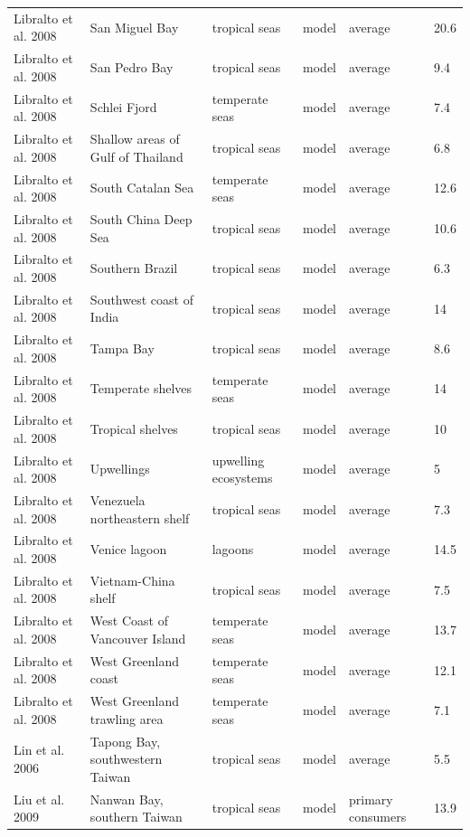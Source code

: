 \documentclass[oneside,12pt,final]{sty/ucthesis-CA2012}
\begin{document}
\begin{mainmatter}
\begin{longtable} {p{3cm}p{3cm}p{1.8cm}lp{2cm}p{1.7cm}}
    Libralto et al. 2008  & San Miguel Bay & tropical seas & model & average & 20.6 \\
    Libralto et al. 2008  & San Pedro Bay & tropical seas & model & average & 9.4 \\
    Libralto et al. 2008   & Schlei Fjord & temperate seas & model & average & 7.4 \\
    Libralto et al. 2008   & Shallow areas of Gulf of Thailand & tropical seas & model & average & 6.8 \\
    Libralto et al. 2008   & South Catalan Sea & temperate seas & model & average & 12.6 \\
    Libralto et al. 2008   & South China Deep Sea & tropical seas & model & average & 10.6 \\
    Libralto et al. 2008   & Southern Brazil & tropical seas & model & average & 6.3 \\
    Libralto et al. 2008   & Southwest coast of India & tropical seas & model & average & 14 \\
    Libralto et al. 2008  & Tampa Bay & tropical seas & model & average & 8.6 \\
    Libralto et al. 2008  & Temperate shelves & temperate seas & model & average & 14 \\
    Libralto et al. 2008   & Tropical shelves & tropical seas & model & average & 10 \\
    Libralto et al. 2008   & Upwellings & upwelling ecosystems & model & average & 5 \\
    Libralto et al. 2008   & Venezuela northeastern shelf & tropical seas & model & average & 7.3 \\
    Libralto et al. 2008   & Venice lagoon & lagoons & model & average & 14.5 \\
    Libralto et al. 2008   & Vietnam-China shelf & tropical seas & model & average & 7.5 \\
    Libralto et al. 2008   & West Coast of Vancouver Island & temperate seas & model & average & 13.7 \\
    Libralto et al. 2008   & West Greenland  coast & temperate seas & model & average & 12.1 \\
    Libralto et al. 2008   & West Greenland trawling area & temperate seas & model & average & 7.1 \\
    Lin et al. 2006  &  Tapong Bay, southwestern Taiwan & tropical seas & model & average & 5.5 \\
    Liu et al. 2009  &  Nanwan Bay, southern Taiwan & tropical seas & model & primary consumers & 13.9 \\

\end{longtable}
\end{mainmatter}
\end{document}
